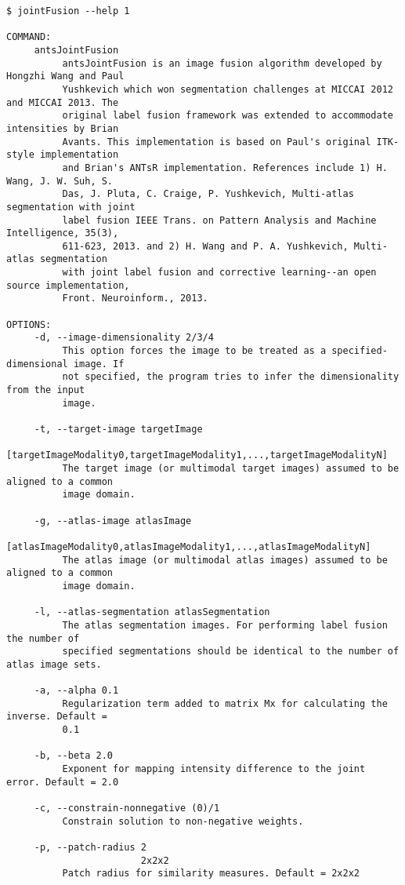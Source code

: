 \documentclass{InsightArticle}
\begin{document}
\small
\begin{verbatim}
$ jointFusion --help 1

COMMAND:
     antsJointFusion
          antsJointFusion is an image fusion algorithm developed by Hongzhi Wang and Paul
          Yushkevich which won segmentation challenges at MICCAI 2012 and MICCAI 2013. The
          original label fusion framework was extended to accommodate intensities by Brian
          Avants. This implementation is based on Paul's original ITK-style implementation
          and Brian's ANTsR implementation. References include 1) H. Wang, J. W. Suh, S.
          Das, J. Pluta, C. Craige, P. Yushkevich, Multi-atlas segmentation with joint
          label fusion IEEE Trans. on Pattern Analysis and Machine Intelligence, 35(3),
          611-623, 2013. and 2) H. Wang and P. A. Yushkevich, Multi-atlas segmentation
          with joint label fusion and corrective learning--an open source implementation,
          Front. Neuroinform., 2013.

OPTIONS:
     -d, --image-dimensionality 2/3/4
          This option forces the image to be treated as a specified-dimensional image. If
          not specified, the program tries to infer the dimensionality from the input
          image.

     -t, --target-image targetImage
                        [targetImageModality0,targetImageModality1,...,targetImageModalityN]
          The target image (or multimodal target images) assumed to be aligned to a common
          image domain.

     -g, --atlas-image atlasImage
                       [atlasImageModality0,atlasImageModality1,...,atlasImageModalityN]
          The atlas image (or multimodal atlas images) assumed to be aligned to a common
          image domain.

     -l, --atlas-segmentation atlasSegmentation
          The atlas segmentation images. For performing label fusion the number of
          specified segmentations should be identical to the number of atlas image sets.

     -a, --alpha 0.1
          Regularization term added to matrix Mx for calculating the inverse. Default =
          0.1

     -b, --beta 2.0
          Exponent for mapping intensity difference to the joint error. Default = 2.0

     -c, --constrain-nonnegative (0)/1
          Constrain solution to non-negative weights.

     -p, --patch-radius 2
                        2x2x2
          Patch radius for similarity measures. Default = 2x2x2


\end{verbatim}
\end{document}
